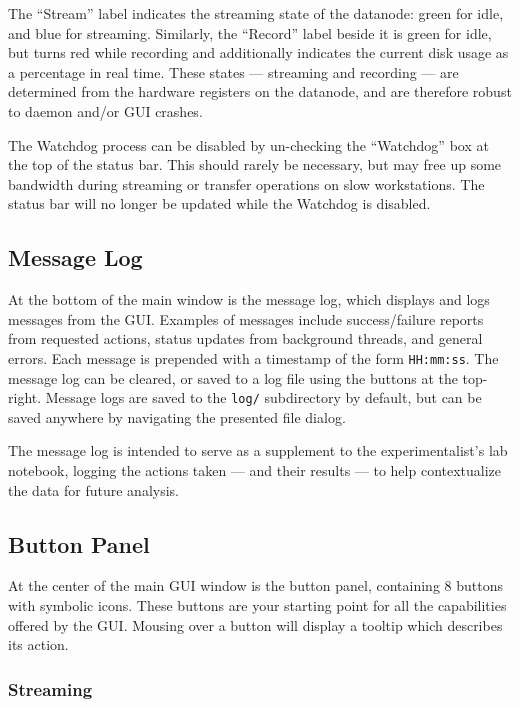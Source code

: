The ``Stream'' label indicates the streaming state of the datanode: green for idle, and blue for streaming. Similarly, the ``Record'' label beside it is green for idle, but turns red while recording and additionally indicates the current disk usage as a percentage in real time. These states --- streaming and recording --- are determined from the hardware registers on the datanode, and are therefore robust to daemon and/or GUI crashes.

The Watchdog process can be disabled by un-checking the ``Watchdog'' box at the top of the status bar. This should rarely be necessary, but may free up some bandwidth during streaming or transfer operations on slow workstations. The status bar will no longer be updated while the Watchdog is disabled.


\subsection{Message Log}
\label{sec_usage_messagelog}

At the bottom of the main window is the message log, which displays and logs messages from the GUI. Examples of messages include success/failure reports from requested actions, status updates from background threads, and general errors. Each message is prepended with a timestamp of the form \texttt{HH:mm:ss}. The message log can be cleared, or saved to a log file using the buttons at the top-right. Message logs are saved to the \texttt{log/} subdirectory by default, but can be saved anywhere by navigating the presented file dialog.

The message log is intended to serve as a supplement to the experimentalist's lab notebook, logging the actions taken --- and their results --- to help contextualize the data for future analysis.


\subsection{Button Panel}
\label{sec_usage_buttonpanel}

At the center of the main GUI window is the button panel, containing 8 buttons with symbolic icons. These buttons are your starting point for all the capabilities offered by the GUI. Mousing over a button will display a tooltip which describes its action.

\subsubsection{Streaming}
\label{sec_usage_acquire_streaming}

